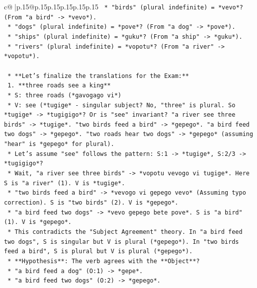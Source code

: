 \documentclass{article}
\begin{document}
{\begin{supertabular}{c@{$\;$}|p{.15\linewidth}@{}p{.15\linewidth}p{.15\linewidth}p{.15\linewidth}p{.15\linewidth}p{.15\linewidth}}
{{{\texttt{                                *   "birds" (plural indefinite) = *vevo*? (From "a bird" {-}> *vevo*).} \\
\texttt{                                *   "dogs" (plural indefinite) = *pove*? (From "a dog" {-}> *pove*).} \\
\texttt{                                *   "ships" (plural indefinite) = *guku*? (From "a ship" {-}> *guku*).} \\
\texttt{                                *   "rivers" (plural indefinite) = *vopotu*? (From "a river" {-}> *vopotu*).} \\
\\ 
\texttt{            *   **Let's finalize the translations for the Exam:**} \\
\texttt{                1.  **three roads see a king**} \\
\texttt{                    *   S: three roads (*gavogago vi*)} \\
\texttt{                    *   V: see (*tugige* {-} singular subject? No, "three" is plural. So *tugige* {-}> *tugigigo*? Or is "see" invariant? "a river see three birds" {-}> *tugige*. "two birds feed a bird" {-}> *gepego*. "a bird feed two dogs" {-}> *gepego*. "two roads hear two dogs" {-}> *gepego* (assuming "hear" is *gepego* for plural).} \\
\texttt{                    *   Let's assume "see" follows the pattern: S:1 {-}> *tugige*, S:2/3 {-}> *tugigigo*?} \\
\texttt{                    *   Wait, "a river see three birds" {-}> *vopotu vevogo vi tugige*. Here S is "a river" (1). V is *tugige*.} \\
\texttt{                    *   "two birds feed a bird" {-}> *vevogo vi gepego vevo* (Assuming typo correction). S is "two birds" (2). V is *gepego*.} \\
\texttt{                    *   "a bird feed two dogs" {-}> *vevo gepego bete pove*. S is "a bird" (1). V is *gepego*.} \\
\texttt{                    *   This contradicts the "Subject Agreement" theory. In "a bird feed two dogs", S is singular but V is plural (*gepego*). In "two birds feed a bird", S is plural but V is plural (*gepego*).} \\
\texttt{                    *   **Hypothesis**: The verb agrees with the **Object**?} \\
\texttt{                        *   "a bird feed a dog" (O:1) {-}> *gepe*.} \\
\texttt{                        *   "a bird feed two dogs" (O:2) {-}> *gepego*.} \\
}}}
\end{supertabular}}
\end{document}
